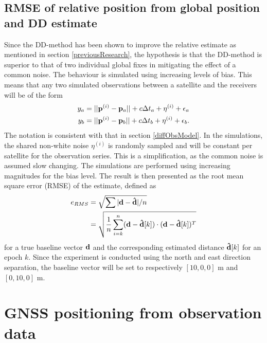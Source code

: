 \subsection{RMSE of relative position from global position and DD estimate }\label{RMSE}
Since the DD-method has been shown to improve the relative estimate as mentioned in section \ref{previousResearch}, the hypothesis is that the DD-method is superior to that of two individual global fixes in mitigating the effect of a common noise. The behaviour is simulated using increasing levels of bias. This means that any two simulated observations between a satellite and the receivers will be of the form 
\begin{align}
y_a&=||{\bf p}^{(i)}-{\bf p}_{a}||+c\Delta t_a+\eta^{(i)}+ \epsilon_a\\
y_b&=||{\bf p}^{(i)}-{\bf p}_{b}||+c\Delta t_b+\eta^{(i)}+\epsilon_b.
\end{align}
The notation is consistent with that in section \ref{diffObsModel}. In the simulations, the shared non-white noise $\eta^{(i)}$ is randomly sampled and will be constant per satellite for the observation series. This is a simplification, as the common noise is assumed slow changing. The simulations are performed using increasing magnitudes for the bias level. The result is then presented as the root mean square error (RMSE) of the estimate, defined as
\begin{align}
e_{RMS}	&=\sqrt{\sum   |{\bf d-\hat{d}}|/n} \nonumber \\
		&=\sqrt{\frac{1}{n}\sum_{i=k}^{n} ({\bf d-\hat{d}}[k])\cdot ({\bf d-\hat{d}}[k])^T} \label{eqERMS}
\end{align} 
for a true baseline vector $\bf d$ and the corresponding estimated distance ${\bf \hat{d}}[k]$ for an epoch $k$. Since the experiment is conducted using the north and east direction separation, the baseline vector will be set to respectively $[10, 0,0]$ m and $[0, 10, 0]$ m.


\section{GNSS positioning from observation data}

